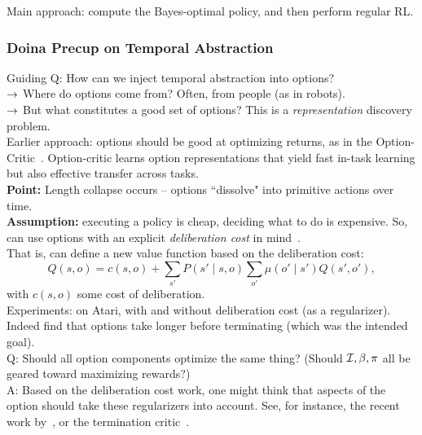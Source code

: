 Main approach: compute the Bayes-optimal policy, and then perform regular RL.



\subsubsection{Doina Precup on Temporal Abstraction}

Guiding Q: How can we inject temporal abstraction into options? \\

$\rightarrow$ Where do options come from? Often, from people (as in robots). \\

$\rightarrow$ But what constitutes a good set of options? This is a {\it representation} discovery problem. \\

Earlier approach: options should be good at optimizing returns, as in the Option-Critic~\cite{bacon2017option}. Option-critic learns option representations that yield fast in-task learning but also effective transfer across tasks. \\

{\bf Point:} Length collapse occurs -- options ``dissolve" into primitive actions over time. \\

{\bf Assumption:} executing a policy is cheap, deciding what to do is expensive. So, can use options with an explicit {\it deliberation cost} in mind~\cite{harb2018waiting}. \\

That is, can define a new value function based on the deliberation cost:
\[
Q(s, o) = c(s,o) + \sum_{s'} P(s' \mid s,o) \sum_{o'} \mu(o' \mid s') Q(s',o'),
\]
with $c(s,o)$ some cost of deliberation. \\


Experiments: on Atari, with and without deliberation cost (as a regularizer). Indeed find that options take longer before terminating (which was the intended goal). \\

 Q: Should all option components optimize the same thing? (Should $\mathcal{I}, \beta, \pi$ all be geared toward maximizing rewards?) \\
 
 A: Based on the deliberation cost work, one might think that aspects of the option should take these regularizers into account. See, for instance, the recent work by~\citet{harutyunyan2018learning}, or the termination critic~\cite{harutyunyan2019termination}.\\
 
